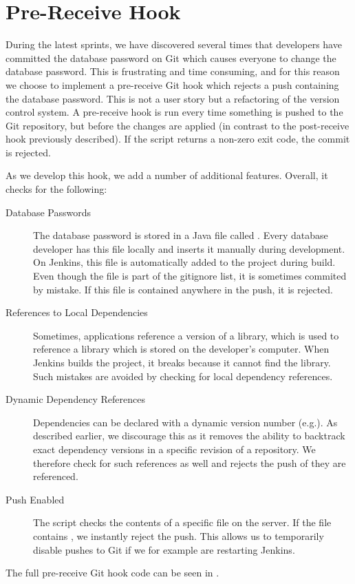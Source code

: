 \section{Pre-Receive Hook}\label{sec:prereceivehook}
During the latest sprints, we have discovered several times that developers have committed the database password on Git which causes everyone to change the database password. This is frustrating and time consuming, and for this reason we choose to implement a pre-receive Git hook which rejects a push containing the database password. This is not a user story but a refactoring of the version control system. A pre-receive hook is run every time something is pushed to the Git repository, but before the changes are applied (in contrast to the post-receive hook previously described). If the script returns a non-zero exit code, the commit is rejected.

As we develop this hook, we add a number of additional features. Overall, it checks for the following:
\begin{description}
  \item[Database Passwords] The database password is stored in a Java file called . Every database developer has this file locally and inserts it manually during development. On Jenkins, this file is automatically added to the project during build. Even though the file is part of the gitignore list, it is sometimes commited by mistake. If this file is contained anywhere in the push, it is rejected.
  \item[References to Local Dependencies] Sometimes, applications reference a  version of a library, which is used to reference a library which is stored on the developer's computer. When Jenkins builds the project, it breaks because it cannot find the library. Such mistakes are avoided by checking for local dependency references.
  \item[Dynamic Dependency References] Dependencies can be declared with a dynamic version number (e.g.\@ {}). As described earlier, we discourage this as it removes the ability to backtrack exact dependency versions in a specific revision of a repository. We therefore check for such references as well and rejects the push of they are referenced.
  \item[Push Enabled] The script checks the contents of a specific file on the server. If the file contains , we instantly reject the push. This allows us to temporarily disable pushes to Git if we for example are restarting Jenkins.
\end{description}
The full pre-receive Git hook code can be seen in .